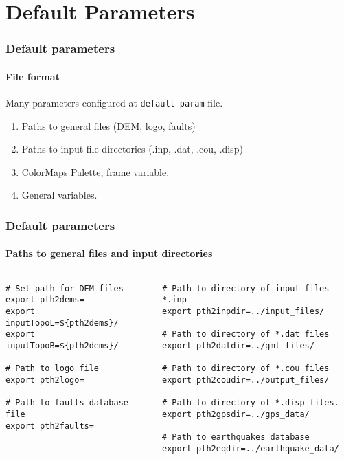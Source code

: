 \section[Defaults]{Default Parameters}

\graphicspath{{Chapter3/Figs/}}

\begin{frame}
  \frametitle{Default parameters}
  \framesubtitle{File format}
  \label{ch3fr:defformat}
  
Many parameters configured at \texttt{default-param} file. 
\begin{enumerate}
\item  Paths to general files (DEM, logo, faults) 
\item Paths to input file directories (.inp, .dat, .cou, .disp) 
\item ColorMaps Palette, frame variable. 
\item General variables.
\end{enumerate}
\end{frame}
\note{} %

\begin{frame}[t,fragile]
  \frametitle{Default parameters}
  \framesubtitle{Paths to general files and input directories}
  \label{ch3fr:pth2gen}
\begin{columns}[t]
  \begin{column}{.45\textwidth}
	\begin{scriptsize}
	  \begin{verbatim}
# Set path for DEM files
export pth2dems=
export inputTopoL=${pth2dems}/
export inputTopoB=${pth2dems}/

# Path to logo file
export pth2logo=

# Path to faults database file
export pth2faults=
\end{verbatim}
    \end{scriptsize}
  \end{column}
  \begin{column}{.54\textwidth}
\begin{scriptsize}
	\begin{verbatim}
# Path to directory of input files *.inp
export pth2inpdir=../input_files/

# Path to directory of *.dat files
export pth2datdir=../gmt_files/

# Path to directory of *.cou files
export pth2coudir=../output_files/

# Path to directory of *.disp files.
export pth2gpsdir=../gps_data/

# Path to earthquakes database
export pth2eqdir=../earthquake_data/
\end{verbatim}	  
	\end{scriptsize}
  \end{column}
\end{columns}
\end{frame}
\note{} %

